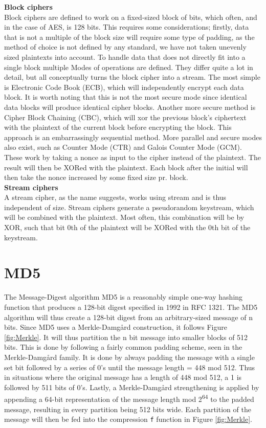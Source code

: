 \documentclass[a4paper, openany]{book}
\begin{document}
\begin{abstact}
\textbf{Block ciphers}\\
Block ciphers are defined to work on a fixed-sized block of bits, which often, and in the case of AES, is 128 bits. This requires some considerations; firstly, data that is not a multiple of the block size will require some type of padding, as the method of choice is not defined by any standard, we have not taken unevenly sized plaintexts into account. To handle data that does not directly fit into a single block multiple Modes of operations are defined. They differ quite a lot in detail, but all conceptually turns the block cipher into a stream. The most simple is Electronic Code Book (ECB), which will independently encrypt each data block. It is worth noting that this is not the most secure mode since identical data blocks will produce identical cipher blocks. Another more secure method is Cipher Block Chaining (CBC), which will xor the previous block's ciphertext with the plaintext of the current block before encrypting the block. This approach is an embarrassingly sequential method. More parallel and secure modes also exist, such as Counter Mode (CTR) and Galois Counter Mode (GCM). These work by taking a nonce as input to the cipher instead of the plaintext. The result will then be XORed with the plaintext. Each block after the initial will then take the nonce increased by some fixed size pr. block.\\

\textbf{Stream ciphers}\\
A stream cipher, as the name suggests, works using stream and is thus independent of size. Stream ciphers generate a pseudorandom keystream, which will be combined with the plaintext. Most often, this combination will be by XOR, such that bit 0th of the plaintext will be XORed with the 0th bit of the keystream.

\section{MD5}
\label{MD5alg}
The Message-Digest algorithm MD5 is a reasonably simple one-way hashing function that produces a 128-bit digest specified in 1992 in RFC 1321\cite{rfc1321}.
The MD5 algorithm will thus create a 128-bit digest from an arbitrary-sized message of n bits. Since MD5 uses a Merkle-Damgård construction, it follows Figure \ref{fig:Merkle}. It will thus partition the n bit message into smaller blocks of 512 bits. This is done by following a fairly common padding scheme, seen in the Merkle-Damgård family. It is done by always padding the message with a single set bit followed by a series of 0's until the message length = 448 mod 512. Thus in situations where the original message has a length of 448 mod 512, a 1 is followed by 511 bits of 0's. Lastly, a Merkle-Damgård strengthening is applied by appending a 64-bit representation of the message length mod 2\textsuperscript{64} to the padded message, resulting in every partition being 512 bits wide.
Each partition of the message will then be fed into the compression \texttt{f} function in Figure \ref{fig:Merkle}.



\end{abstact}
\end{document}
